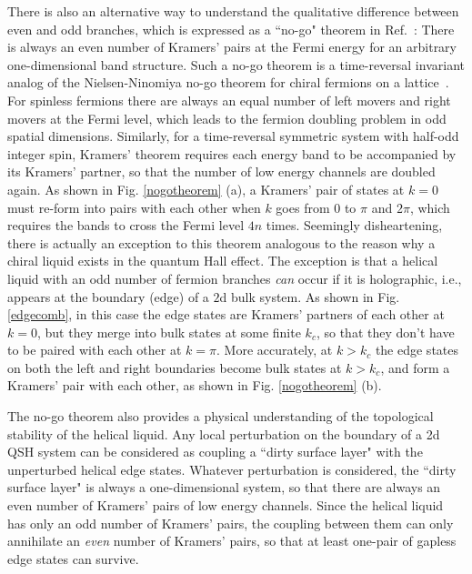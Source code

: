 \documentclass{article}
\begin{document}
There is also an alternative way to understand the qualitative
difference between even and odd branches, which is expressed as a
``no-go" theorem in Ref.~: There is always an even
number of Kramers' pairs at the Fermi energy for an arbitrary
one-dimensional band structure. Such a no-go theorem is a
time-reversal invariant analog of the Nielsen-Ninomiya no-go
theorem for chiral fermions on a
lattice~\cite{NIELSEN1981,NIELSEN1981A}. For spinless fermions
there are always an equal number of left movers and right movers
at the Fermi level, which leads to the fermion doubling problem in
odd spatial dimensions. Similarly, for a time-reversal symmetric
system with half-odd integer spin, Kramers' theorem requires each
energy band to be accompanied by its Kramers' partner, so that the
number of low energy channels are doubled again. As shown in Fig.
\ref{nogotheorem} (a), a Kramers' pair of states at $k=0$ must
re-form into pairs with each other when $k$ goes from $0$ to $\pi$
and $2\pi$, which requires the bands to cross the Fermi level $4n$
times. Seemingly disheartening, there is actually an exception to
this theorem analogous to the reason why a chiral liquid exists in
the quantum Hall effect. The exception is that a helical liquid
with an odd number of fermion branches \emph{can} occur if it is
holographic, i.e., appears at the boundary (edge) of a $2$d bulk
system. As shown in Fig. \ref{edgecomb}, in this case the edge
states are Kramers' partners of each other at $k=0$, but they
merge into bulk states at some finite $k_c$, so that they don't
have to be paired with each other at $k=\pi$. More accurately, at
$k>k_c$ the edge states on both the left and right boundaries
become bulk states at $k>k_c$, and form a Kramers' pair with each
other, as shown in Fig. \ref{nogotheorem} (b).

The no-go theorem also provides a physical understanding of the
topological stability of the helical liquid. Any local
perturbation on the boundary of a 2d QSH system can be considered
as coupling a ``dirty surface layer" with the unperturbed helical
edge states. Whatever perturbation is considered, the ``dirty
surface layer" is always a one-dimensional system, so that there
are always an even number of Kramers' pairs of low energy
channels. Since the helical liquid has only an odd number of
Kramers' pairs, the coupling between them can only annihilate an
{\em even} number of Kramers' pairs, so that at least one-pair of
gapless edge states can survive.
\end{document}
